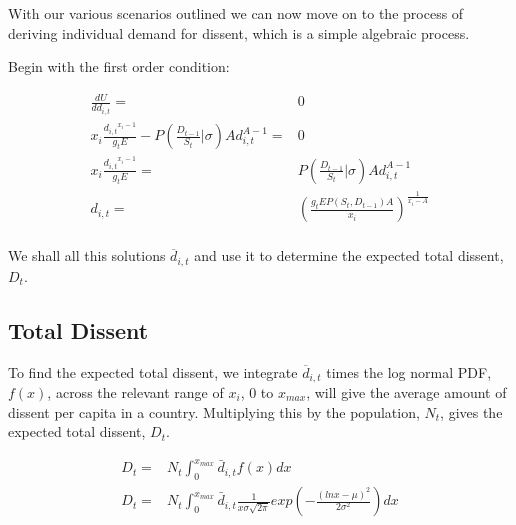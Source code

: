 \documentclass[12pt]{article}
\begin{document}
\begin{spacing}{1.5}
With our various scenarios outlined we can now move on to the process of deriving individual demand for dissent, which is a simple algebraic process. 

\vspace{1 em}
\noindent Begin with the first order condition: 

\begin{equation}
	\begin{aligned}
\frac{dU}{dd_{i,t}}=& 0\\ 
x_i \frac{{d_{i,t}}^{x_i -1}}{g_t E} - P\left(\frac{D_{t-1}}{S_t}\Big|\sigma \right)Ad_{i,t}^{A-1}=& 0 \\
	x_i \frac{{d_{i,t}}^{x_i -1}}{g_t E} =& P\left(\frac{D_{t-1}}{S_t}\Big|\sigma \right)Ad_{i,t}^{A-1}\\
		d_{i,t}=& \left(\frac{g_tEP(S_t,D_{t-1})A}{x_i} \right)^{\frac{1}{x_i -A}}\\ 	
	\end{aligned}
\end{equation}

We shall all this solutions $\overline{d}_{i,t}$ and use it to determine the expected total dissent, $D_t$. 

   
\subsection{Total Dissent}
 
To find the expected total dissent, we integrate $\overline{d}_{i,t}$ times the log normal PDF, $f(x)$, across the relevant range of $x_i$, $0$ to $x_{max}$, will give the average amount of dissent per capita in a country. Multiplying this by the population, $N_t$, gives the expected total dissent, $D_t$.

\begin{equation}
	\begin{aligned}
D_t=& N_t \int_{0}^{x_{max}} \bar{d}_{i,t} f(x) dx \\	
D_t	=& N_t \int_{0}^{x_{max}} \bar{d}_{i,t} \frac{1}{x\sigma \sqrt{2\pi}}exp  \left( -\frac{(lnx-\mu)^2}{2\sigma^2} \right)  dx \\	
	\end{aligned}
\end{equation}


\end{spacing}
\end{document}
